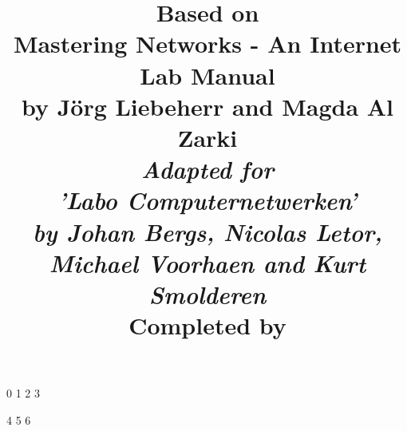 

\title{
\textbf{Based on \\ Mastering Networks - An Internet Lab Manual\\
by J\"{o}rg Liebeherr and Magda Al Zarki}\\
\vspace{10mm}
\large{\emph{Adapted for \\ 'Labo Computernetwerken' \\
by Johan Bergs, Nicolas Letor, Michael Voorhaen and Kurt Smolderen}} \\
\vspace{10mm}
\large{Completed by}
\vspace{-10mm}
}




\frontmatter
\maketitle

\mainmatter
%
\setcounter {chapter} {0}
%
\setcounter {chapter} {1}
%
\setcounter {chapter} {2}
%
\setcounter {chapter} {3}

\setcounter {chapter} {4}
%
\setcounter {chapter} {5}
%
\setcounter {chapter} {6}
%
\backmatter


 
